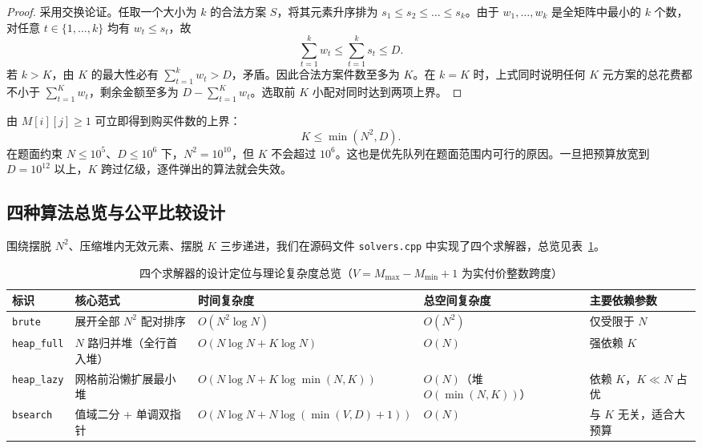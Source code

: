 \documentclass[12pt,a4paper,fontset=windows]{ctexart}
\theoremstyle{plain}
\newcommand{\code}[1]{\texttt{#1}}
\newcommand{\tabhead}[1]{\textbf{#1}}
\begin{document}
\begin{proof}
采用交换论证\cite{clrs2022}。任取一个大小为 $k$ 的合法方案 $S$，将其元素升序排为 $s_1 \le s_2 \le \dots \le s_k$。由于 $w_1, \dots, w_k$ 是全矩阵中最小的 $k$ 个数，对任意 $t \in \{1, \dots, k\}$ 均有 $w_t \le s_t$，故
\[
\sum_{t=1}^{k} w_t \le \sum_{t=1}^{k} s_t \le D.
\]
若 $k > K$，由 $K$ 的最大性必有 $\sum_{t=1}^{k} w_t > D$，矛盾。因此合法方案件数至多为 $K$。在 $k=K$ 时，上式同时说明任何 $K$ 元方案的总花费都不小于 $\sum_{t=1}^{K} w_t$，剩余金额至多为 $D - \sum_{t=1}^{K} w_t$。选取前 $K$ 小配对同时达到两项上界。
\end{proof}

由 $M[i][j] \ge 1$ 可立即得到购买件数的上界：
\[
K \le \min(N^2, D).
\]
在题面约束 $N \le 10^5$、$D \le 10^6$ 下，$N^2 = 10^{10}$，但 $K$ 不会超过 $10^6$。这也是优先队列在题面范围内可行的原因。一旦把预算放宽到 $D = 10^{12}$ 以上，$K$ 跨过亿级，逐件弹出的算法就会失效。

\subsection{四种算法总览与公平比较设计}

围绕摆脱 $N^2$、压缩堆内无效元素、摆脱 $K$ 三步递进，我们在源码文件 \code{solvers.cpp} 中实现了四个求解器，总览见表~\ref{tab:algo_overview}。

\begin{table}[htbp]
\centering
\caption{四个求解器的设计定位与理论复杂度总览（$V = M_{\max} - M_{\min} + 1$ 为实付价整数跨度）}
\label{tab:algo_overview}
\footnotesize
\setlength{\tabcolsep}{3.4pt}
\begin{tabular}{@{}l>{\raggedright\arraybackslash}p{3.0cm}l>{\raggedright\arraybackslash}p{2.3cm}>{\raggedright\arraybackslash}p{2.5cm}@{}}
\toprule
\rowcolor{gray!12}\tabhead{标识} & \tabhead{核心范式} & \tabhead{时间复杂度} & \tabhead{总空间复杂度} & \tabhead{主要依赖参数} \\
\midrule
\code{brute}      & 展开全部 $N^2$ 配对排序 & $O(N^2 \log N)$ & $O(N^2)$ & 仅受限于 $N$ \\
\code{heap\_full} & $N$ 路归并堆（全行首入堆） & $O(N\log N + K\log N)$ & $O(N)$ & 强依赖 $K$ \\
\code{heap\_lazy} & 网格前沿懒扩展最小堆 & $O(N\log N + K\log\min(N,K))$ & $O(N)$（堆 $O(\min(N,K))$） & 依赖 $K$，$K\ll N$ 占优 \\
\code{bsearch}    & 值域二分 + 单调双指针 & $O(N\log N + N\log(\min(V,D)+1))$ & $O(N)$ & 与 $K$ 无关，适合大预算 \\
\bottomrule
\end{tabular}
\end{table}
\end{document}
